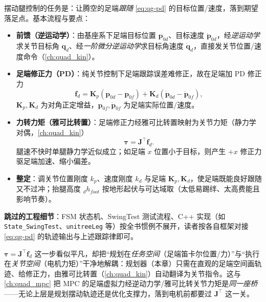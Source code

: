 \begin{practice}[摆动腿轨迹跟踪：足端 PD + $\boldsymbol{\tau}=\mathbf{J}^\top\mathbf{f}$]
摆动腿控制的任务是：让腾空的足端\emph{跟随} \cref{eq:qg-pd} 的目标位置/速度，落到期望落足点。基本流程与要点：
\begin{itemize}
  \item \textbf{前馈（逆运动学）}：由基座系下足端目标位置 $\boldsymbol{p}_{0d}$、目标速度 $\dot{\boldsymbol{p}}_{0d}$，经\emph{逆运动学}求关节目标角 $\boldsymbol{q}_d$、经\emph{一阶微分逆运动学}求目标角速度 $\dot{\boldsymbol{q}}_d$，直接发关节位置/速度命令（\cref{ch:quad_kin}）。
  \item \textbf{足端修正力（PD）}：纯关节控制下足端跟踪误差难修正，故在足端加 PD 修正力\cite{unitree2023quadruped}
  \[
    \boldsymbol{f}_d=\boldsymbol{K}_p(\boldsymbol{p}_{0d}-\boldsymbol{p}_{0f})+\boldsymbol{K}_d(\dot{\boldsymbol{p}}_{0d}-\dot{\boldsymbol{p}}_{0f}),
  \]
  $\boldsymbol{K}_p,\boldsymbol{K}_d$ 为对角正定增益，$\boldsymbol{p}_{0f},\dot{\boldsymbol{p}}_{0f}$ 为足端实际位置/速度。
  \item \textbf{力转力矩（雅可比转置）}：足端修正力经雅可比转置映射为关节力矩（静力学对偶，\cref{ch:quad_kin}）
  \[
    \boldsymbol{\tau}=\boldsymbol{J}^\top\boldsymbol{f}_d.
  \]
  腿速不快时单腿静力学近似成立；如足端 $x$ 位置小于目标，则产生 $+x$ 修正力驱足端加速、缩小偏差\cite{unitree2023quadruped}。
  \item \textbf{整定}：调关节位置刚度 $k_p$、速度刚度 $k_d$ 与足端 $\boldsymbol{K}_p,\boldsymbol{K}_d$，使足端既能良好跟随又不过冲；抬腿高度 ${}_dh_{foot}$ 按地形起伏与可达域取（太低易踢绊、太高费能且影响节奏）。
\end{itemize}
\textbf{跳过的工程细节}：FSM 状态机、SwingTest 测试流程、C++ 实现（如 \texttt{State\_SwingTest}、\texttt{unitreeLeg} 等）按全书惯例不展开，读者按各自框架对接 \cref{eq:qg-pd} 的轨迹输出与上述跟踪律即可。
\end{practice}

\begin{insight}[力—力矩对偶把规划与执行解耦]\label{ins:qg-jacobian}
$\boldsymbol{\tau}=\boldsymbol{J}^\top\boldsymbol{f}_d$ 这一步看似平凡，却把“规划在\emph{任务空间}（足端笛卡尔位置/力）”与“执行在\emph{关节空间}（电机力矩）”干净地解耦：规划器（本章）只需在直观的足端空间画轨迹、给修正力，由雅可比转置（\cref{ch:quad_kin}）自动翻译为关节指令。这与 \cref{ch:quad_mpc} 把 MPC 的足端虚拟力经逆动力学/雅可比转关节力矩是\emph{同一座桥}——无论上层是规划摆动轨迹还是优化支撑力，落到电机前都要过 $\boldsymbol{J}^\top$ 这一关。
\end{insight}

